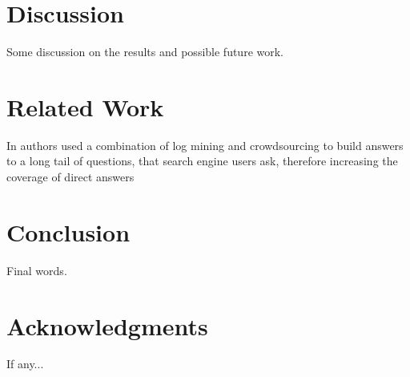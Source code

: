 \documentclass[11pt,letterpaper]{article}
\begin{document}
\section{Discussion}
\label{sec:discussion}

Some discussion on the results and possible future work.

\section{Related Work}
\label{sec:related_work}

In \cite{bernstein2012direct} authors used a combination of log mining and crowdsourcing to build answers to a long tail of questions, that search engine users ask, therefore increasing the coverage of direct answers

\section{Conclusion}
\label{sec:conclusion}

Final words.

\section*{Acknowledgments}

If any...



\end{document}
